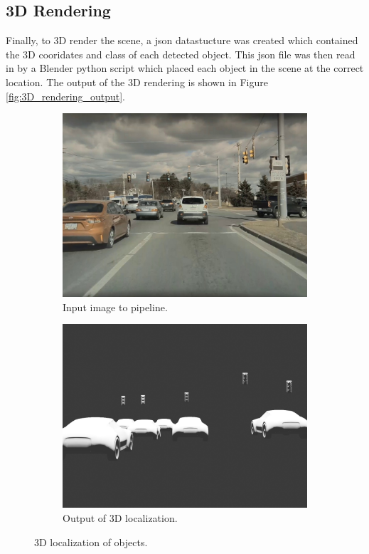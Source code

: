 \subsection{3D Rendering}
Finally, to 3D render the scene, a json datastucture was created which contained the 3D cooridates and class of each detected object. This json file was then read in by a Blender python script which placed each object in the scene at the correct location. The output of the 3D rendering is shown in Figure \ref{fig:3D_rendering_output}.
\begin{figure}
    \centering
    \begin{subfigure}{0.95\linewidth}
        \centering
        \includegraphics[width=\textwidth]{images/localization_in.jpg}
        \caption{Input image to pipeline.}
    \end{subfigure}
    \begin{subfigure}{0.95\linewidth}
        \centering
        \includegraphics[width=\textwidth]{images/localization.png}
        \caption{Output of 3D localization.}
    \end{subfigure}
    \caption{3D localization of objects.}
    \label{fig:3D_localization_output}
\end{figure}

